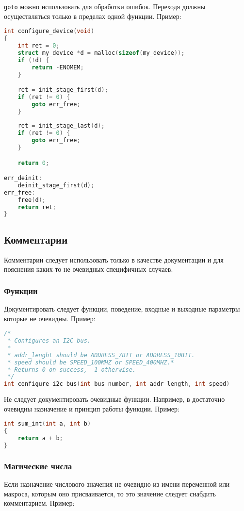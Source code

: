 \verb|goto| можно использовать для обработки ошибок. Переходя должны осуществляться только в пределах одной функции. Пример:
\begin{lstlisting}[language=C]
int configure_device(void)
{
    int ret = 0;
    struct my_device *d = malloc(sizeof(my_device));
    if (!d) {
        return -ENOMEM;
    }

    ret = init_stage_first(d);
    if (ret != 0) {
        goto err_free;
    }
    
    ret = init_stage_last(d);
    if (ret != 0) {
        goto err_free;
    }

    return 0;

err_deinit:
    deinit_stage_first(d);
err_free:
    free(d);
    return ret;
}
\end{lstlisting}

\subsection*{Комментарии}

Комментарии следует использовать только в качестве документации и для пояснения каких-то не очевидных специфичных случаев.

\subsubsection*{Функции}

Документировать следует функции, поведение, входные и выходные параметры которые не очевидны. Пример:
\begin{lstlisting}[language=C]
/*
 * Configures an I2C bus.
 *
 * addr_lenght should be ADDRESS_7BIT or ADDRESS_10BIT.
 * speed should be SPEED_100MHZ or SPEED_400MHZ.*
 * Returns 0 on success, -1 otherwise.
 */
int configure_i2c_bus(int bus_number, int addr_length, int speed)
\end{lstlisting}

Не следует документировать очевидные функции. Например, в достаточно очевидны назначение и принцип работы функции. Пример:
\begin{lstlisting}[language=C]
int sum_int(int a, int b)
{
    return a + b;
}
\end{lstlisting}

\subsubsection*{Магические числа}

Если назначение числового значения не очевидно из имени переменной или макроса, которым оно присваивается, то это значение следует снабдить комментарием. Пример:

